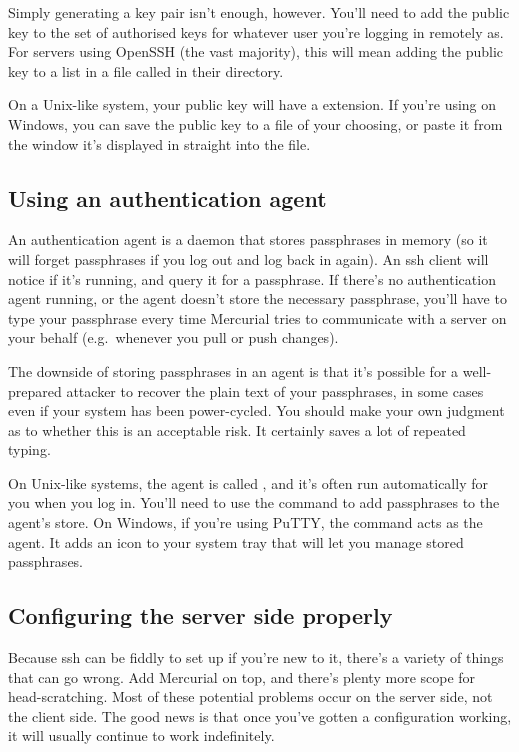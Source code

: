 Simply generating a key pair isn't enough, however.  You'll need to
add the public key to the set of authorised keys for whatever user
you're logging in remotely as.  For servers using OpenSSH (the vast
majority), this will mean adding the public key to a list in a file
called  in their 
directory.

On a Unix-like system, your public key will have a 
extension.  If you're using  on Windows, you can
save the public key to a file of your choosing, or paste it from the
window it's displayed in straight into the
 file.

\subsection{Using an authentication agent}

An authentication agent is a daemon that stores passphrases in memory
(so it will forget passphrases if you log out and log back in again).
An ssh client will notice if it's running, and query it for a
passphrase.  If there's no authentication agent running, or the agent
doesn't store the necessary passphrase, you'll have to type your
passphrase every time Mercurial tries to communicate with a server on
your behalf (e.g.~whenever you pull or push changes).

The downside of storing passphrases in an agent is that it's possible
for a well-prepared attacker to recover the plain text of your
passphrases, in some cases even if your system has been power-cycled.
You should make your own judgment as to whether this is an acceptable
risk.  It certainly saves a lot of repeated typing.

On Unix-like systems, the agent is called , and
it's often run automatically for you when you log in.  You'll need to
use the  command to add passphrases to the agent's
store.  On Windows, if you're using PuTTY, the 
command acts as the agent.  It adds an icon to your system tray that
will let you manage stored passphrases.

\subsection{Configuring the server side properly}

Because ssh can be fiddly to set up if you're new to it, there's a
variety of things that can go wrong.  Add Mercurial on top, and
there's plenty more scope for head-scratching.  Most of these
potential problems occur on the server side, not the client side.  The
good news is that once you've gotten a configuration working, it will
usually continue to work indefinitely.

